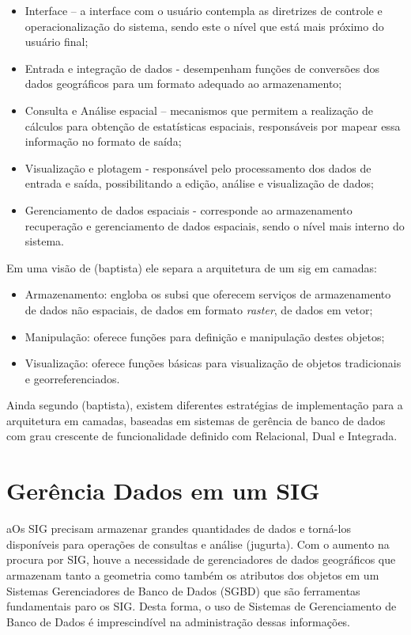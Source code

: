 \documentclass[
	12pt,				%
    oneside,			%
	a4paper,			%
	english,			%
	french,				%
	spanish,			%
	brazil,				%
	]{abntex2}
\begin{document}
\begin{itemize}
    \item Interface – a interface com o usuário contempla as diretrizes de controle e operacionalização do sistema, sendo este o nível que está mais próximo do usuário final;
    \item Entrada e integração de dados - desempenham funções de conversões dos dados geográficos para um formato adequado ao armazenamento;
    \item Consulta e Análise espacial – mecanismos que permitem a realização de cálculos para obtenção de estatísticas espaciais, responsáveis por mapear essa informação no formato de saída;
    \item Visualização e plotagem -  responsável pelo processamento dos dados de entrada e saída, possibilitando a edição, análise e visualização de dados;
    \item Gerenciamento de dados espaciais -  corresponde ao armazenamento recuperação e gerenciamento de dados espaciais, sendo o nível mais interno do sistema.
\end{itemize}

Em uma visão de (baptista) ele separa a arquitetura de um sig em camadas:

\begin{itemize}
    \item Armazenamento: engloba os subsi que oferecem serviços de armazenamento de dados não espaciais, de dados em formato \textit{raster}, de dados em vetor;
    \item Manipulação: oferece funções para definição e manipulação destes objetos;
    \item Visualização: oferece funções básicas para visualização de objetos tradicionais e georreferenciados.
\end{itemize}

Ainda segundo (baptista), existem diferentes estratégias de implementação para a arquitetura em camadas, baseadas em sistemas de gerência de banco de dados com grau crescente de funcionalidade definido com Relacional, Dual e Integrada.

\section{Gerência Dados em um SIG}aOs SIG precisam armazenar grandes quantidades de dados e torná-los disponíveis para operações de consultas e análise (jugurta). Com o aumento na procura por SIG, houve a necessidade de gerenciadores de dados geográficos que armazenam tanto a geometria como também os atributos dos objetos em um Sistemas Gerenciadores de Banco de Dados (SGBD) que são ferramentas fundamentais paro os SIG. Desta forma, o uso de Sistemas de Gerenciamento de Banco de Dados é imprescindível na administração dessas informações.
\end{document}
